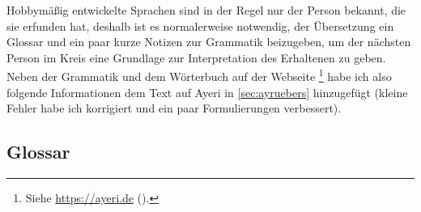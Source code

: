 \documentclass[
	12pt,
	ngerman,
]{scrartcl}
\begin{document}
Hobbymäßig entwickelte Sprachen sind in der Regel nur der Person bekannt, die
sie erfunden hat, deshalb ist es normalerweise notwendig, der Übersetzung ein
Glossar und ein paar kurze Notizen zur Grammatik beizugeben, um der nächsten
Person im Kreis eine Grundlage zur Interpretation des Erhaltenen zu geben.
Neben der Grammatik und dem Wörterbuch auf der Webseite%
%
	\footnote{Siehe \url{https://ayeri.de} ().}
%
habe ich also folgende Informationen dem Text auf Ayeri in \cref{sec:ayruebers}
hinzugefügt (kleine Fehler habe ich korrigiert und ein paar Formulierungen
verbessert).

\subsection{Glossar}

\end{document}
